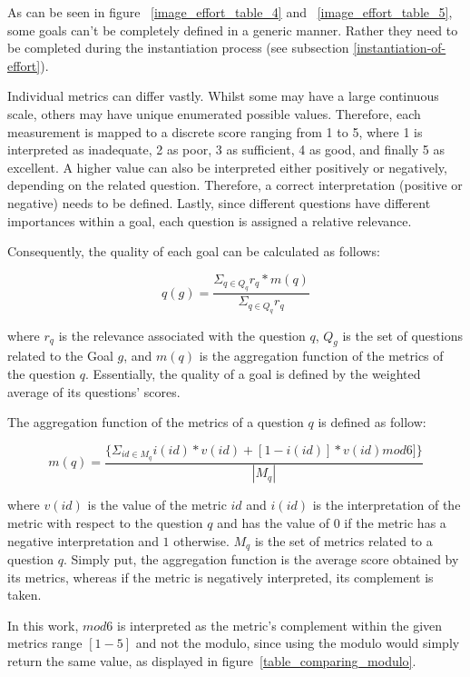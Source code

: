 As can be seen in figure ~\ref{image_effort_table_4} and ~\ref{image_effort_table_5},
some goals can't be completely defined in
a generic manner. Rather they need to be completed during the
instantiation process (see subsection \ref{instantiation-of-effort}).

Individual metrics can differ vastly. Whilst some may have a large
continuous scale, others may have unique enumerated possible values.
Therefore, each measurement is mapped to a discrete score ranging from 1
to 5, where 1 is interpreted as inadequate, 2 as poor, 3 as sufficient,
4 as good, and finally 5 as excellent. A higher value can also be
interpreted either positively or negatively, depending on the related
question. Therefore, a correct interpretation (positive or negative)
needs to be defined. Lastly, since different questions have different
importances within a goal, each question is assigned a relative
relevance.

\begin{minipage}{\textwidth}
Consequently, the quality of each goal can be calculated as
follows:

\[
q(g)=\frac{\Sigma_{q\in Q_q}r_q*m(q)}{\Sigma_{q\in Q_q}r_q}
\]

where \(r_q\) is the relevance associated with the question \(q\),
\(Q_g\) is the set of questions related to the Goal \(g\), and \(m(q)\)
is the aggregation function of the metrics of the question \(q\).
Essentially, the quality of a goal is defined by the weighted average of
its questions' scores.
\end{minipage}
\newpage
\begin{minipage}{\textwidth}
    The aggregation function of the metrics of a
    question \(q\) is defined as follow:

\[
    m(q)=\frac
    {\{\Sigma_{id\in M_q}
        i(id)*v(id)
        +[1-i(id)]
        *v(id)mod6]
        \}}
    {|M_q|}
\]

where \(v(id)\) is the value of the metric \(id\) and \(i(id)\) is the
interpretation of the metric with respect to the question \(q\) and has
the value of \(0\) if the metric has a negative interpretation and \(1\)
otherwise. \(M_q\) is the set of metrics related to a question \(q\).
    Simply put, the aggregation function is the average score obtained by
    its metrics, whereas if the metric is negatively interpreted, its
    complement is taken.
\end{minipage}


In this work, \(mod6\) is
interpreted as the metric's complement within the given metrics range
\([1-5]\) and not the modulo, since using the modulo would simply return the same value,
as displayed in figure~\ref{table_comparing_modulo}.
\newpage

